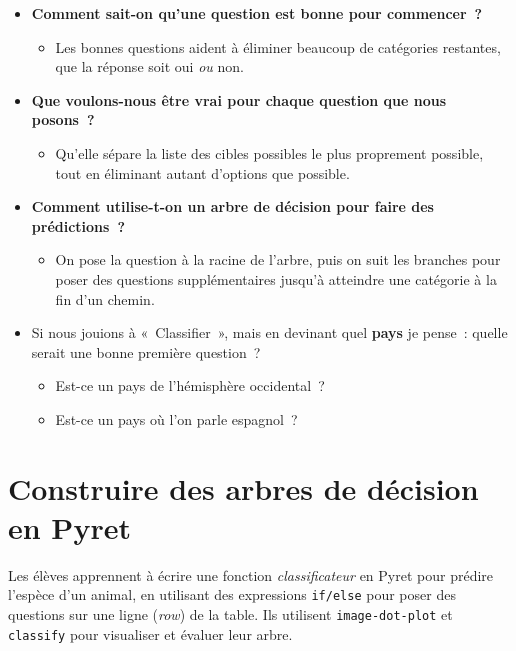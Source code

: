 \documentclass[12pt,a4paper]{article}
\begin{document}
\begin{thinkbox}
  \begin{itemize}
    \item \textbf{Comment sait-on qu'une question est bonne pour commencer~?}
    \begin{itemize}
      \item Les bonnes questions aident à éliminer beaucoup de catégories restantes, que la réponse soit oui \emph{ou} non.
    \end{itemize}
    \item \textbf{Que voulons-nous être vrai pour chaque question que nous posons~?}
    \begin{itemize}
      \item Qu'elle sépare la liste des cibles possibles le plus proprement possible, tout en éliminant autant d'options que possible.
    \end{itemize}
    \item \textbf{Comment utilise-t-on un arbre de décision pour faire des prédictions~?}
    \begin{itemize}
      \item On pose la question à la racine de l'arbre, puis on suit les branches pour poser des questions supplémentaires jusqu'à atteindre une catégorie à la fin d'un chemin.
    \end{itemize}
    \item Si nous jouions à «~Classifier~», mais en devinant quel \textbf{pays} je pense~: quelle serait une bonne première question~?
    \begin{itemize}
      \item Est-ce un pays de l'hémisphère occidental~?
      \item Est-ce un pays où l'on parle espagnol~?
    \end{itemize}
  \end{itemize}
\end{thinkbox}

\newpage

\section{Construire des arbres de décision en Pyret}

\begin{overviewbox}
  Les élèves apprennent à écrire une fonction \emph{classificateur} en Pyret pour prédire l'espèce d'un animal, en utilisant des expressions \texttt{if/else} pour poser des questions sur une ligne (\emph{row}) de la table. Ils utilisent \texttt{image-dot-plot} et \texttt{classify} pour visualiser et évaluer leur arbre.
\end{overviewbox}
\end{document}
